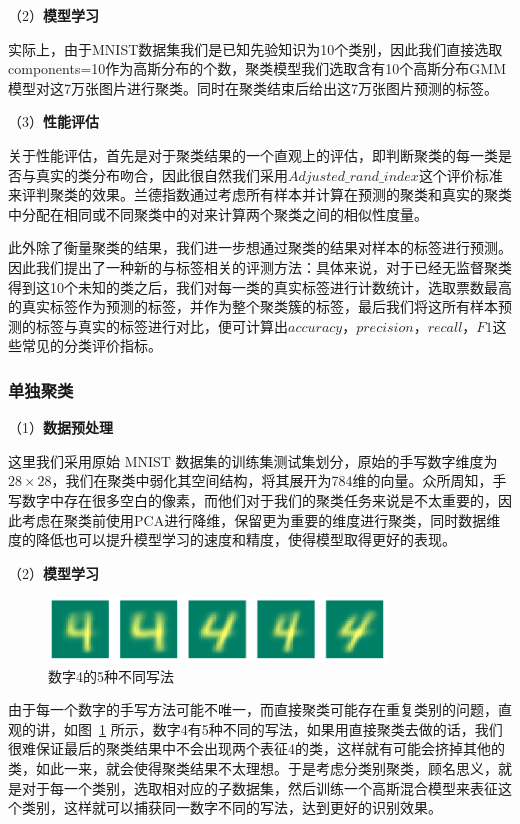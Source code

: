 \documentclass[UTF8]{ctexart}
\begin{document}
（2）\textbf{模型学习}

实际上，由于MNIST数据集我们是已知先验知识为10个类别，因此我们直接选取components=10作为高斯分布的个数，聚类模型我们选取含有10个高斯分布GMM模型对这7万张图片进行聚类。同时在聚类结束后给出这7万张图片预测的标签。

（3）\textbf{性能评估}

关于性能评估，首先是对于聚类结果的一个直观上的评估，即判断聚类的每一类是否与真实的类分布吻合，因此很自然我们采用$Adjusted\_ rand\_index$这个评价标准来评判聚类的效果。兰德指数通过考虑所有样本并计算在预测的聚类和真实的聚类中分配在相同或不同聚类中的对来计算两个聚类之间的相似性度量。

此外除了衡量聚类的结果，我们进一步想通过聚类的结果对样本的标签进行预测。因此我们提出了一种新的与标签相关的评测方法：具体来说，对于已经无监督聚类得到这10个未知的类之后，我们对每一类的真实标签进行计数统计，选取票数最高的真实标签作为预测的标签，并作为整个聚类簇的标签，最后我们将这所有样本预测的标签与真实的标签进行对比，便可计算出$accuracy$，$precision$，$recall$，$F1$这些常见的分类评价指标。

\subsubsection{单独聚类}

（1）\textbf{数据预处理}

这里我们采用原始 MNIST 数据集的训练集测试集划分，原始的手写数字维度为$28 \times 28$，我们在聚类中弱化其空间结构，将其展开为784维的向量。众所周知，手写数字中存在很多空白的像素，而他们对于我们的聚类任务来说是不太重要的，因此考虑在聚类前使用PCA进行降维，保留更为重要的维度进行聚类，同时数据维度的降低也可以提升模型学习的速度和精度，使得模型取得更好的表现。

（2）\textbf{模型学习}

\begin{figure}[!h]
  \includegraphics[width=0.8\textwidth]{./figures/diff4.pdf}
  \centering
  \caption{数字4的5种不同写法}\label{fig:diff4}
\end{figure}

由于每一个数字的手写方法可能不唯一，而直接聚类可能存在重复类别的问题，直观的讲，如图~\ref{fig:diff4} 所示，数字4有5种不同的写法，如果用直接聚类去做的话，我们很难保证最后的聚类结果中不会出现两个表征4的类，这样就有可能会挤掉其他的类，如此一来，就会使得聚类结果不太理想。于是考虑分类别聚类，顾名思义，就是对于每一个类别，选取相对应的子数据集，然后训练一个高斯混合模型来表征这个类别，这样就可以捕获同一数字不同的写法，达到更好的识别效果。
\end{document}
